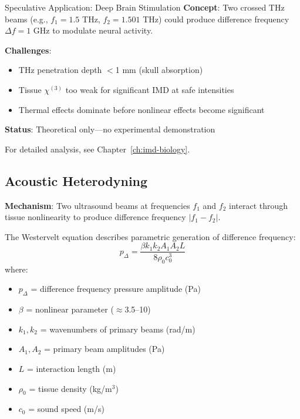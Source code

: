 \begin{scope}[shift={(8,0)}]
\begin{calloutbox}[colback=black!3!white,colframe=black!50!white]{Speculative Application: Deep Brain Stimulation}
\textbf{Concept}: Two crossed THz beams (e.g., $f_1 = 1.5$ THz, $f_2 = 1.501$ THz) could produce difference frequency $\Delta f = 1$ GHz to modulate neural activity.

\textbf{Challenges}:
\begin{itemize}
\item THz penetration depth $<$1 mm (skull absorption)
\item Tissue $\chi^{(3)}$ too weak for significant IMD at safe intensities
\item Thermal effects dominate before nonlinear effects become significant
\end{itemize}

\textbf{Status}: Theoretical only---no experimental demonstration
\end{calloutbox}

For detailed analysis, see Chapter~\ref{ch:imd-biology}.

\subsection{Acoustic Heterodyning}

\textbf{Mechanism}: Two ultrasound beams at frequencies $f_1$ and $f_2$ interact through tissue nonlinearity to produce difference frequency $|f_1 - f_2|$.

The Westervelt equation describes parametric generation of difference frequency:
\begin{equation}
\label{eq:westervelt}
p_{\Delta} = \frac{\beta k_1 k_2 A_1 A_2 L}{8\rho_0 c_0^3}
\end{equation}
where:
\begin{itemize}
\item $p_{\Delta}$ = difference frequency pressure amplitude (Pa)
\item $\beta$ = nonlinear parameter ($\approx$3.5--10)
\item $k_1, k_2$ = wavenumbers of primary beams (rad/m)
\item $A_1, A_2$ = primary beam amplitudes (Pa)
\item $L$ = interaction length (m)
\item $\rho_0$ = tissue density (kg/m$^3$)
\item $c_0$ = sound speed (m/s)
\end{itemize}


\end{scope}
